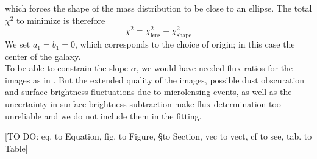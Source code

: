 which forces the shape of the mass distribution to be close to an ellipse. The total $\chi^2$ to minimize is therefore
\begin{equation*}
\chi^2 = \chi^2_\text{lens} + \chi^2_\text{shape}
\end{equation*}
We set $a_1 = b_1 = 0$, which corresponds to the choice of origin; in this case the center of the galaxy.
\\To be able to constrain the slope $\alpha$, we would have needed flux ratios for the images as in \citet{GlennEC}. But the extended quality of the images, possible dust obscuration and surface brightness fluctuations due to microlensing events, as well as the uncertainty in surface brightness subtraction make flux determination too unreliable and we do not include them in the fitting.

[TO DO: eq. to Equation, fig. to Figure, \S to Section, vec to vect, cf to see, tab. to Table]